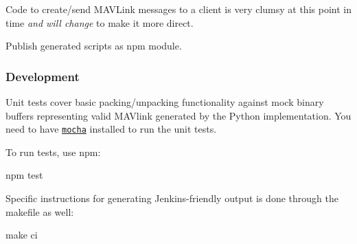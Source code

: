 Code to create/send M\+A\+V\+Link messages to a client is very clumsy at this point in time {\itshape and will change} to make it more direct.

Publish generated scripts as npm module.

\subsubsection*{Development}

Unit tests cover basic packing/unpacking functionality against mock binary buffers representing valid M\+A\+Vlink generated by the Python implementation. You need to have \href{http://visionmedia.github.com/mocha/}{\tt mocha} installed to run the unit tests.

To run tests, use npm\+:


\begin{DoxyCode}
npm test
\end{DoxyCode}


Specific instructions for generating Jenkins-\/friendly output is done through the makefile as well\+:


\begin{DoxyCode}
make ci
\end{DoxyCode}
 